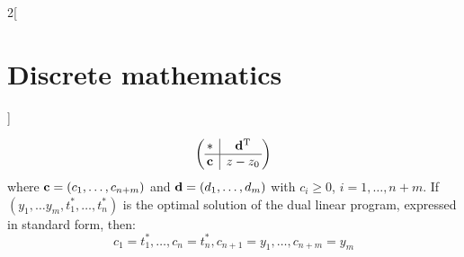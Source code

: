 \documentclass[../../../main.tex]{subfiles}
\begin{document}
\begin{multicols}{2}[\section{Discrete mathematics}]
\begin{theorem}
    $$\left(
      \begin{array}{@{\,} c|c @{\,}}
          *                  & \transpose{d} \\
          \hline
          \vectorfunction{c} & z-z_0         \\
        \end{array}\right)$$ where $\boldsymbol{\mathrm{c}}=(c_1,\ldots,c_{n+m})$ and $\boldsymbol{\mathrm{d}}=(d_1,\ldots,d_m)$ with $c_i\geq0$, $i=1,\ldots,n+m$. If $(y_1,\ldots y_m,t_1^*,\ldots,t_n^*)$ is the optimal solution of the dual linear program, expressed in standard form, then: $$c_1=t_1^*,\ldots,c_n=t_n^*, c_{n+1}=y_1,\ldots,c_{n+m}=y_m$$
  \end{theorem}
\end{multicols}
\end{document}
